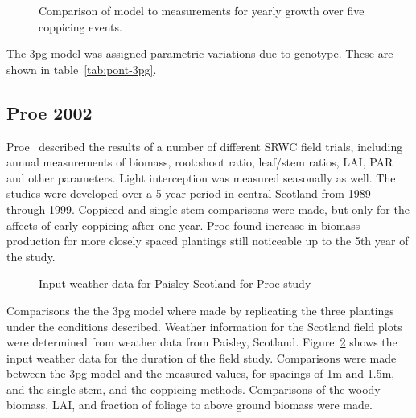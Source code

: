 \documentclass[10pt]{article}
\begin{document}
\begin{figure}[!ht]
  \centering
  
  \caption{Comparison of model to measurements for yearly growth over five
    coppicing events.}
\label{fig:pont-biomass}
\end{figure}


The \ac{3pg}
model was assigned parametric variations due to genotype.  These are
shown in table~\ref{tab:pont-3pg}.

\begin{table}[!ht]
  \centering
  \caption{\ac{3pg} parameter variations of \ac{3pg} among genotypes}
  \label{tab:pont-3pg}
\end{table}


\subsection*{Proe 2002}

Proe~\cite{Proe2002} described the results of a number of different
\ac{SRWC} field trials, including annual measurements of biomass,
root:shoot ratio, leaf/stem ratios, LAI, PAR and other parameters.
Light interception was measured seasonally as well.  The studies were
developed over a 5 year period in central Scotland from 1989 through
1999. Coppiced and single stem comparisons
were made, but only for the affects of early coppicing after one year.
Proe found increase in biomass production for more closely spaced
plantings still noticeable up to the 5th year of the study.

\begin{figure}
  \centering
  
  \caption{Input weather data for Paisley Scotland for Proe study}
  \label{fig:proe-weather}
\end{figure}

Comparisons the the \ac{3pg} model where made by replicating the three
plantings under the conditions described.  Weather information for the
Scotland field plots were determined from weather data from Paisley,
Scotland.  Figure~\ref{fig:proe-weather} shows the input weather data
for the duration of the field study.  Comparisons were made between
the \ac{3pg} model and the measured values, for spacings of 1m and
1.5m, and the single stem, and the coppicing methods.  Comparisons of
the woody biomass, \ac{LAI}, and fraction of foliage to above ground
biomass were made.
\end{document}
